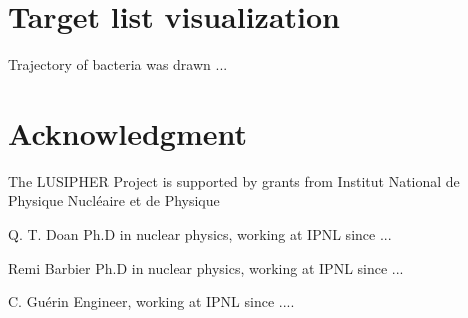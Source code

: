 \documentclass[journal]{IEEEtran}
\begin{document}
\section{Target list visualization}
Trajectory of bacteria was drawn ...


\section*{Acknowledgment}
The LUSIPHER Project is supported by grants from Institut National de Physique Nucl\'eaire et de Physique


 




\begin{IEEEbiography}{Q. T. Doan}
Ph.D in nuclear physics, working at IPNL since ...
\end{IEEEbiography}

\begin{IEEEbiographynophoto}{Remi Barbier}
Ph.D in nuclear physics, working at IPNL since ...
\end{IEEEbiographynophoto}

\begin{IEEEbiographynophoto}{C. Gu\'erin}
Engineer, working at IPNL since ....
\end{IEEEbiographynophoto}
\end{document}
